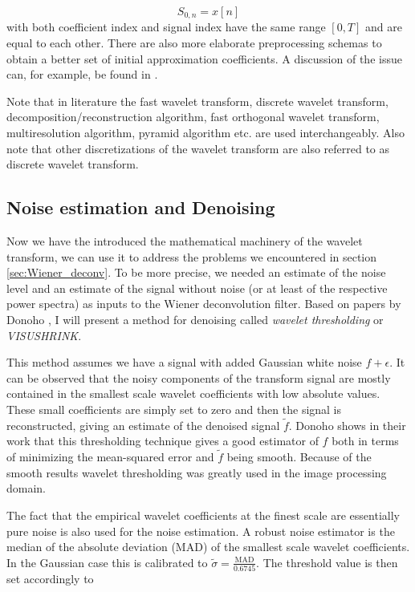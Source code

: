 \begin{equation}
    S_{0, n} = x[n]
\end{equation}
with both coefficient index and signal index have the same range $[0, T]$ and are equal to each other. There are also more elaborate preprocessing schemas to obtain 
a better set of initial approximation coefficients. A discussion of the issue can, for example, be found in \cite{strang1996wavelets}. 


Note that in literature the fast wavelet transform, discrete wavelet transform,
decomposition/reconstruction algorithm, fast orthogonal wavelet transform, multiresolution algorithm, pyramid algorithm etc. are used interchangeably. Also note that 
other discretizations of the wavelet transform are also referred to as discrete wavelet transform.

\subsection{Noise estimation and Denoising}

Now we have the introduced the mathematical machinery of the wavelet transform, we can use it to address the problems we encountered in section \ref{sec:Wiener_deconv}.
To be more precise, we needed an estimate of the noise level and an estimate of the signal without noise (or at least of the respective power spectra)
as inputs to the Wiener deconvolution filter. 
Based on papers by Donoho \cite{donoho1994ideal}, \cite{donoho1995noising} I will present a method for denoising called \textit{wavelet thresholding} or 
\textit{VISUSHRINK}.

This method assumes we have a signal with added Gaussian white noise $f + \epsilon$. It can be observed that the noisy components of the transform signal are mostly contained
in the smallest scale wavelet coefficients with low absolute values. These small coefficients are simply set to zero and then the signal is reconstructed, 
giving an estimate of the denoised signal $\tilde{f}$. Donoho shows in their work that this thresholding technique gives a good estimator of $f$ both in terms of 
minimizing the mean-squared error and $\tilde{f}$ being smooth. Because of the smooth results wavelet thresholding was greatly used in the image processing domain. 

The fact that the empirical wavelet coefficients at the finest scale are essentially pure noise is also used for the noise estimation. A robust noise estimator
is the median of the absolute deviation (MAD) of the smallest scale wavelet coefficients. In the Gaussian case this is calibrated to 
$\tilde{\sigma} = \frac{\text{MAD}}{0.6745}$. The threshold value is then set accordingly to 

